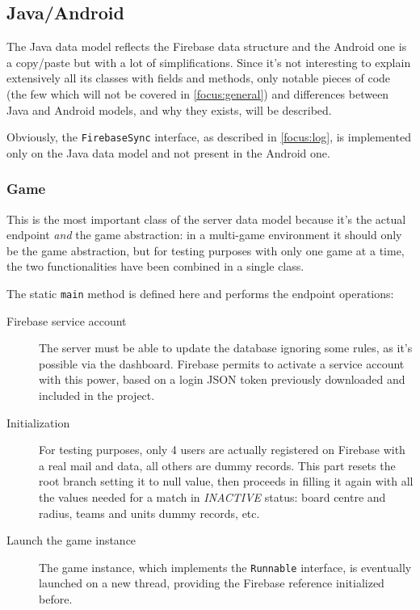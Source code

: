 		\subsection{Java/Android}
			
			The Java data model reflects the Firebase data structure and the Android one is a copy/paste but with a lot of simplifications. Since it's not interesting to explain extensively all its classes with fields and methods, only notable pieces of code (the few which will not be covered in \autoref{focus:general}) and differences between Java and Android models, and why they exists, will be described.
			
			Obviously, the \lstinline|FirebaseSync| interface, as described in \autoref{focus:log}, is implemented only on the Java data model and not present in the Android one.
			
			\subsubsection{Game}
		
				This is the most important class of the server data model because it's the actual endpoint \emph{and} the game abstraction: in a multi-game environment it should only be the game abstraction, but for testing purposes with only one game at a time, the two functionalities have been combined in a single class.
				
				The static \lstinline|main| method is defined here and performs the endpoint operations:
				\begin{description}
					\item[Firebase service account] The server must be able to update the database ignoring some rules, as it's possible via the dashboard. Firebase permits to activate a service account with this power, based on a login JSON token previously downloaded and included in the project.
					\item[Initialization] For testing purposes, only 4 users are actually registered on Firebase with a real mail and data, all others are dummy records. This part resets the root branch setting it to null value, then proceeds in filling it again with all the values needed for a match in \emph{INACTIVE} status: board centre and radius, teams and units dummy records, etc.
					\item[Launch the game instance] The game instance, which implements the \lstinline|Runnable| interface, is eventually launched on a new thread, providing the Firebase reference initialized before.
				\end{description}
				
